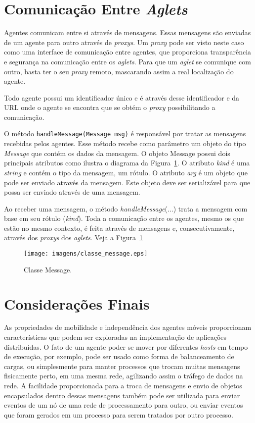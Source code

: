\section{Comunicação Entre \textit{Aglets}}

	Agentes comunicam entre si através de mensagens. Essas mensagens são enviadas de um agente para outro através de \textit{proxys}. Um \textit{proxy} pode ser visto neste caso como uma interface de comunicação entre agentes, que proporciona transparência e segurança na comunicação entre os \textit{aglets}. Para que um \textit{aglet} se comunique com outro, basta ter o seu \textit{proxy} remoto, mascarando assim a real localização do agente.
	
	Todo agente possui um identificador único e é através desse identificador e da URL onde o agente se encontra que se obtém o \textit{proxy} possibilitando a comunicação.
	
	O método \texttt{handleMessage(Message msg)} é responsável por tratar as mensagens recebidas pelos agentes. Esse método recebe como parâmetro um objeto do tipo \textit{Message} que contém os dados da mensagem. O objeto Message possui dois principais atributos como ilustra o diagrama da Figura~\ref{fig:classe_message}. O atributo \textit{kind} é uma \textit{string} e contém o tipo da mensagem, um rótulo. O atributo \textit{arg} é um objeto que pode ser enviado através da mensagem. Este objeto deve ser serializável para que possa ser enviado através de uma mensagem.


	Ao receber uma mensagem, o método \textit{handleMessage}(...) trata a mensagem com base em seu rótulo (\textit{kind}). Toda a comunicação entre os agentes, mesmo os que estão no mesmo contexto, é feita através de mensagens e, consecutivamente, através dos \textit{proxys} dos \textit{aglets}. Veja a Figura~\ref{fig:classe_message}

\begin{figure}[htb]
  \centering
  \centerline{\texttt{[image: imagens/classe\_message.eps]}}
  \caption{Classe Message.}
\label{fig:classe_message}
\end{figure}

 

\section{Considerações Finais}

	As propriedades de mobilidade e independência dos agentes móveis proporcionam características que podem ser exploradas na implementação de aplicações distribuídas. O fato de um agente poder se mover por diferentes \textit{hosts} em tempo de execução, por exemplo, pode ser usado como forma de balanceamento de cargas, ou simplesmente para manter processos que trocam muitas mensagens fisicamente perto, em uma mesma rede, agilizando assim o tráfego de dados na rede. A facilidade proporcionada para a troca de mensagens e envio de objetos encapsulados dentro dessas mensagens também pode ser utilizada para enviar eventos de um nó de uma rede de processamento para outro, ou enviar eventos que foram gerados em um processo para serem tratados por outro processo. 
	
